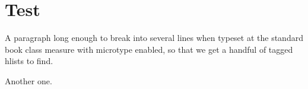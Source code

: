 \documentclass{book}
\begin{document}
\chapter{Test}
A paragraph long enough to break into several lines when typeset at the standard book
class measure with microtype enabled, so that we get a handful of tagged hlists to find.

Another one.
\end{document}
